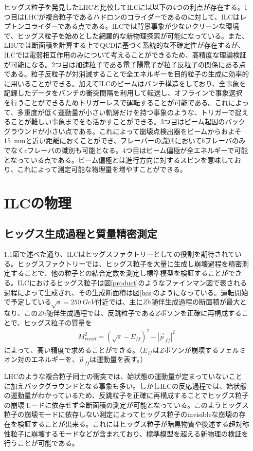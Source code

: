 ヒッグス粒子を発見したLHCと比較してILCには以下の4つの利点が存在する。1つ目はLHCが複合粒子であるハドロンのコライダーであるのに対して、ILCはレプトンコライダーである点である。ILCでは背景事象が少ないクリーンな環境で、ヒッグス粒子を始めとした網羅的な新物理探索が可能になっている。また、LHCでは断面積を計算する上でQCDに基づく系統的な不確定性が存在するが、ILCでは電弱相互作用のみについて考えることができるため、高精度な理論検証が可能になる。2つ目は加速粒子である電子陽電子が粒子反粒子の関係にある点である。粒子反粒子が対消滅することで全エネルギーを目的粒子の生成に効率的に用いることができる。加えてILCのビームはバンチ構造をしており、全事象を記録したデータをバンチの衝突間隔を利用して転送し、オフラインで事象選択を行うことができるためトリガーレスで運転することが可能である。これによって、多重度が低く運動量が小さい軌跡だけを持つ事象のような、トリガーで捉えることが難しい事象までをも活かすことができる。3つ目はビーム起因のバックグラウンドが小さい点である。これによって崩壊点検出器をビームからおよそ\SI{15}{mm}と近い距離におくことができ、フレーバーの識別において$b$フレーバのみでなく$c$フレーバの識別も可能となる。4つ目はビーム偏極が全エネルギーで可能となっている点である。ビーム偏極とは進行方向に対するスピンを意味しており、これによって測定可能な物理量を増やすことができる。
\section{ILCの物理}
\subsection{ヒッグス生成過程と質量精密測定}
1.1節で述べた通り、ILCはヒッグスファクトリーとしての役割を期待されている。ヒッグスファクトリーでは、ヒッグス粒子を大量に生成し崩壊過程を精密測定することで、他の粒子との結合定数を測定し標準模型を検証することができる。ILCにおけるヒッグス粒子は図\ref{product}のようなファインマン図で表される過程によって生成され、その生成断面積は図\ref{hcs}のようになっている。運転開始で予定している$\sqrt{s}=\SI{250}{GeV}$付近では、主に$Zh$随伴生成過程の断面積が最大となり、この$Zh$随伴生成過程では、反跳粒子である$Z$ボソンを正確に再構成することで、ヒッグス粒子の質量を
\begin{align}
\label{recoil}
M_{recoil}^2 = {( \sqrt{s} - E_{ff} )}^2 - {|\vec{p}_{\ ff}|}^2
\end{align}
によって、高い精度で求めることができる。（$E_{ff}$は$Z$ボソンが崩壊するフェルミオン対のエネルギーを、$\vec{p}_{\ ff}$は運動量を表す。）

LHCのような複合粒子同士の衝突では、始状態の運動量が定まっていないことに加えバックグラウンドとなる事象も多い。しかしILCの反応過程では、始状態の運動量がわかっているため、反跳粒子を正確に再構成することでヒッグス粒子の崩壊モードに依存せず全断面積の測定が可能となっている。このようヒッグス粒子の崩壊モードに依存しない測定によってヒッグス粒子のinvisibleな崩壊の存在を検証することが出来る。これにはヒッグス粒子が暗黒物質や後述する超対称性粒子に崩壊するモードなどが含まれており、標準模型を超える新物理の検証を行うことが可能である。

